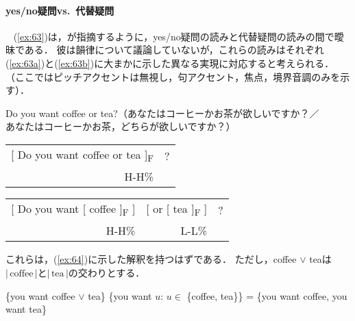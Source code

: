 \documentclass{goken}
\begin{document}
\paragraph{yes/no疑問vs.~代替疑問}\label{sec:2.2.2.3}
\ \newline\indent
(\ref{ex:63})は，\citeauthor{vonStechow1991}が指摘するように，yes/no疑問の読みと代替疑問の読みの間で曖昧である．
彼は韻律について議論していないが，これらの読みはそれぞれ(\ref{ex:63a})と(\ref{ex:63b})に大まかに示した異なる実現に対応すると考えられる．
（ここではピッチアクセントは無視し，句アクセント，焦点，境界音調のみを示す）．

\pagebreak
\begin{exe}
	\ex\label{ex:63} Do you want coffee or tea?（あなたはコーヒーかお茶が欲しいですか？／\\
	\hfill あなたはコーヒーかお茶，どちらが欲しいですか？）
  \begin{xlist}
    \ex\label{ex:63a}
    \begin{tabular}[t]{r@{}l}{}[ Do you want coffee or tea ]\textsubscript{F} & ?\\
    \scriptsize{H-H\%} & \end{tabular}
    \ex\label{ex:63b}
    \begin{tabular}[t]{r@{ }r@{ }l}{}[ Do you want [ coffee ]\textsubscript{F} ] & [ or [ tea ]\textsubscript{F} ] & ?\\
    \scriptsize{H-H\%} & \scriptsize{L-L\%} & \end{tabular}
  \end{xlist}
\end{exe}

\noindent
これらは，(\ref{ex:64})に示した解釈を持つはずである．
ただし，coffee $\vee$ teaは$|\,\text{coffee}\,|$と$|\,\text{tea}\,|$の交わりとする．

\begin{exe}
	\ex\label{ex:64}
  \begin{xlist}
    \ex\label{ex:64a}
    \{you want coffee $\vee$ tea\}
    \ex\label{ex:64b}
    \{you want $u$: $u \in$ \{coffee, tea\}\} = \{you want coffee, you want tea\}
  \end{xlist}
\end{exe}
\end{document}
